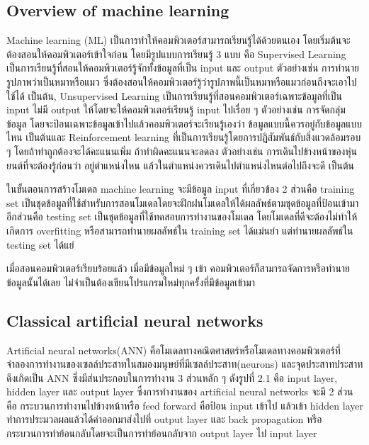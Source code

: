 \documentclass[12pt,oneside,openright,a4paper]{cpe-thai-project}
\begin{document}
\subsection{Overview of machine learning}
\par\setlength{\parindent}{5ex}Machine learning (ML) เป็นการทำให้คอมพิวเตอร์สามารถเรียนรู้ได้ด้วยตนเอง โดยเริ่มต้นจะต้องสอนให้คอมพิวเตอร์เข้าใจก่อน โดยมีรูปแบบการเรียนรู้ 3 แบบ คือ  Supervised Learning เป็นการเรียนรู้ที่สอนให้คอมพิวเตอร์รู้จักทั้งข้อมูลที่เป็น input และ output ตัวอย่างเช่น การทำนายรูปภาพว่าเป็นหมาหรือแมว ซึ่งต้องสอนให้คอมพิวเตอร์รู้ว่ารูปภาพนี้เป็นหมาหรือแมวก่อนถึงจะเอาไปใช้ได้ เป็นต้น, Unsupervised Learning เป็นการเรียนรู้ที่สอนคอมพิวเตอร์เฉพาะข้อมูลที่เป็น input ไม่มี output ให้โดยจะให้คอมพิวเตอร์เรียนรู้ input ไปเรื่อย ๆ ตัวอย่างเช่น การจัดกลุ่มข้อมูล โดยจะป้อนเฉพาะข้อมูลเข้าไปแล้วคอมพิวเตอร์จะเรียนรู้เองว่า ข้อมูลแบบนี้ควรอยู่กับข้อมูลแบบไหน เป็นต้นและ Reinforcement learning ที่เป็นการเรียนรู้โดยการปฏิสัมพันธ์กับสิ่งแวดล้อมรอบ ๆ โดยถ้าทำถูกต้องจะได้คะแนนเพิ่ม ถ้าทำผิดคะแนนจะลดลง ตัวอย่างเช่น การเดินไปข้างหน้าของหุ่นยนต์ที่จะต้องรู้ก่อนว่า อยู่ตำแหน่งไหน แล้วในตำแหน่งควรเดินไปตำแหน่งไหนต่อไปถึงจะดี เป็นต้น
\par\setlength{\parindent}{5ex}ในขั้นตอนการสร้างโมเดล machine learning จะมีข้อมูล input ที่เกี่ยวข้อง 2 ส่วนคือ training set เป็นชุดข้อมูลที่ใช้สำหรับการสอนโมเดลโดยจะฝึกฝนโมเดลให้ได้ผลลัพธ์ตามชุดข้อมูลที่ป้อนเข้ามา อีกส่วนคือ testing set เป็นชุดข้อมูลที่ใช้ทดสอบการทำงานของโมเดล โดยโมเดลที่ดีจะต้องไม่ทำให้เกิดการ overfitting หรือสามารถทำนายผลลัพธ์ใน training set ได้แม่นยำ แต่ทำนายผลลัพธ์ใน testing set ได้แย่ 
\par\setlength{\parindent}{5ex}เมื่อสอนคอมพิวเตอร์เรียบร้อยแล้ว เมื่อมีข้อมูลใหม่ ๆ เข้า คอมพิวเตอร์ก็สามารถจัดการหรือทำนายข้อมูลนั้นได้เลย ไม่จำเป็นต้องเขียนโปรแกรมใหม่ทุกครั้งที่มีข้อมูลเข้ามา

\subsection{Classical artificial neural networks}
\par\setlength{\parindent}{5ex}
Artificial neural networks(ANN) คือโมเดลทางคณิตศาสตร์หรือโมเดลทางคอมพิวเตอร์ที่จำลองการทำงานของเซลล์ประสาทในสมองมนุษย์ที่มีเซลล์ประสาท(neurons) และจุดประสาทประสาท  ดึงเกิดเป็น ANN ซึ่งมีส่นประกอบในการทำงาน 3 ส่วนหลัก ๆ ดังรูปที่ 2.1 คือ input layer, hidden layer และ output layer ซึ่งการทำงานของ artificial neural networks จะมี 2 ส่วนคือ กระบวนการทำงานไปข้างหน้าหรือ feed forward คือป้อน input เข้าไป แล้วเข้า hidden layer ทำการประมวลผลแล้วได้ค่าออกมาส่งไปที่ output layer และ back propagation หรือกระบวนการทำย้อนกลับโดยจะเป็นการทำย้อนกลับจาก output layer ไป input layer
\end{document}
